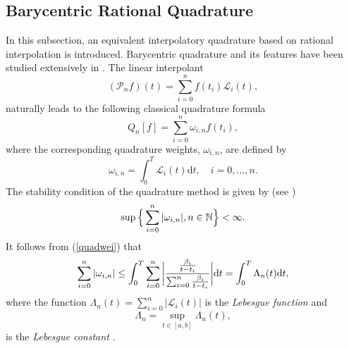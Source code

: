 \documentclass[fleqn,final,3p,11pt]{elsarticle}
\theoremstyle{definition}
\theoremstyle{remark}
\numberwithin{equation}{section}
\begin{document}
\subsection{Barycentric Rational Quadrature}\label{quada123}
In this subsection, an equivalent interpolatory quadrature based on rational interpolation is introduced.
Barycentric quadrature and its features have been studied extensively in \cite{kleinthesis, bary}.
The linear interpolant \[ (\mathcal{P}_{n}f)(t)=\sum_{i=0}^{n}f(t_{i})\mathcal{L}_{i}(t), \]
naturally leads to the following classical quadrature formula
\begin{equation}\label{2.10}
 {Q}_{n}[f] = \sum_{i=0}^{n}\omega_{i,n}f(t_{i}),
\end{equation}
where the corresponding quadrature weights, $ \omega_{i,n} $,  are defined by
\begin{equation}\label{quadwei}\omega_{i,n}=\int_{0}^{T}\mathcal{L}_{i}(t)\mathrm{d}t, \quad i=0, \ldots, n.\end{equation}
The stability condition of the quadrature method is given by (see \cite{hack2})
\[\sup \Big\{ \sum_{i=0}^{n}\vert \omega_{i,n} \vert, n\in \Bbb N\Big\} < \infty.\]
It  follows  from (\ref{quadwei}) that
\begin{equation}\label{123}
\sum_{i=0}^{n}\vert \omega_{i,n}\vert \leq \int_{0}^{T}\sum_{i=0}^{n}\bigg\vert \dfrac{\frac{\beta_{i}}{t-t_{i}}}{\sum_{i=0}^{n}\frac{\beta_{i}}{t-t_{i}}} \bigg{\vert}\mathrm{d}t = \int_{0}^{T}  \Lambda_{n}(t)\mathrm{d}t,
\end{equation}
where the function
$\Lambda_{n}(t)=\sum_{i=0}^{n}\vert \mathcal{L}_{i}(t) \vert$
is the \textit{Lebesgue function} and
\begin{equation}\label{leb}\Lambda_{n}=\sup_{t\in [a,b]}
\Lambda_{n}(t),\end{equation}
is the \textit{Lebesgue constant} \cite{bary}.
\end{document}
